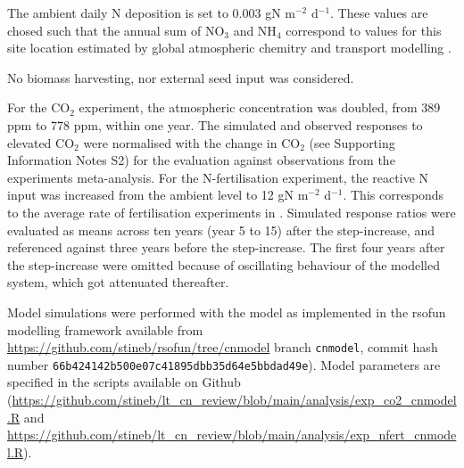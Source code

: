 \documentclass{myreport}
\begin{document}
The ambient daily N deposition is set to 0.003 gN m$^{-2}$ d$^{-1}$. These values are chosed such that the annual sum of NO$_3$ and NH$_4$ correspond to values for this site location estimated by global atmospheric chemitry and transport modelling \citep{lamarque_global_2011}.

No biomass harvesting, nor external seed input was considered.

For the CO$_2$ experiment, the atmospheric concentration was doubled, from 389 ppm to 778 ppm, within one year. The simulated and observed responses to elevated CO$_2$ were normalised with the change in CO$_2$ (see Supporting Information Notes S2) for the evaluation against observations from the experiments meta-analysis. For the N-fertilisation experiment, the reactive N input was increased from the ambient level to 12 gN m$^{-2}$ d$^{-1}$. This corresponds to the average rate of fertilisation experiments in \citep{liang_global_2020}. Simulated response ratios were evaluated as means across ten years (year 5 to 15) after the step-increase, and referenced against three years before the step-increase. The first four years after the step-increase were omitted because of oscillating behaviour of the modelled system, which got attenuated thereafter.

Model simulations were performed with the model as implemented in the {rsofun} modelling framework available from \url{https://github.com/stineb/rsofun/tree/cnmodel} branch \texttt{cnmodel}, commit hash number \texttt{66b424142b500e07c41895dbb35d64e5bbdad49e}). Model parameters are specified in the scripts available on Github (\url{https://github.com/stineb/lt_cn_review/blob/main/analysis/exp_co2_cnmodel.R} and \url{https://github.com/stineb/lt_cn_review/blob/main/analysis/exp_nfert_cnmodel.R}).

\clearpage

\end{document}
